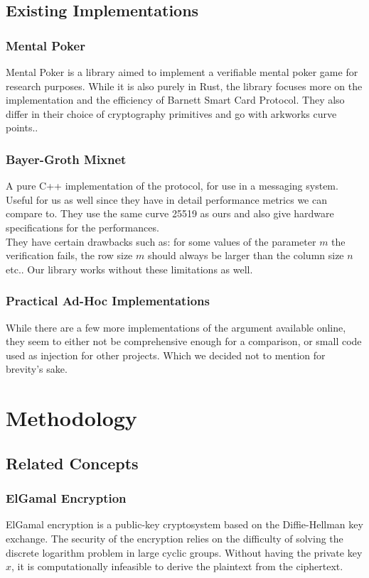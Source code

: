 \documentclass[12pt,a4paper]{report}
\begin{document}
\section{Existing Implementations}
\subsection{Mental Poker}
Mental Poker\cite{mentalpoker} is a library aimed to implement a verifiable
mental poker game for research purposes. While it is also purely in Rust,
the library focuses more on the implementation and the efficiency of 
Barnett Smart Card Protocol\cite{Barnett}. They also differ in their choice
of cryptography primitives and go with arkworks curve points.\cite{arkworks}. 

\subsection{Bayer-Groth Mixnet}
A pure C++ implementation\cite{bgmixnet} of the protocol, for use in a messaging system.
Useful for us as well since they have in detail performance metrics we can
compare to. They use the same curve 25519 as ours and also give hardware specifications for the performances.\\
They have certain drawbacks such as: for some values of the parameter $m$ the 
verification fails, the row size $m$ should always be larger than the column size $n$ etc.. 
Our library works without these limitations as well.

\subsection{Practical Ad-Hoc Implementations}
While there are a few more implementations of the argument available online, 
they seem to either not be comprehensive enough for a comparison,
or small code used as injection for other projects. Which we decided not to
mention for brevity's sake.

\chapter{Methodology}
\section{Related Concepts}

\subsection{ElGamal Encryption}
ElGamal encryption is a public-key cryptosystem based on the Diffie-Hellman key exchange\cite{elgamal}. The security of the encryption relies on the difficulty of solving the discrete logarithm problem in large cyclic groups. Without having the private key $x$, it is computationally infeasible to derive the plaintext from the ciphertext.
\end{document}

